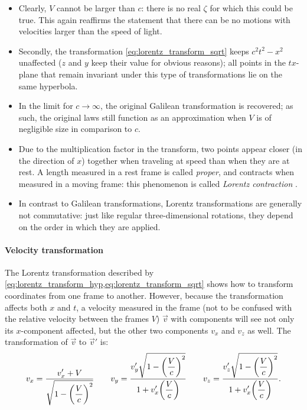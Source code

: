 \begin{itemize}
    \item Clearly, \(V\) cannot be larger than \(c\): there is no real \(\zeta\) for which this could be true. This again reaffirms the statement that there can be no motions with velocities larger than the speed of light.
    \item Secondly, the transformation \cref{eq:lorentz_transform_sqrt} keeps \(c^2t^2 - x^2\) unaffected (\(z\) and \(y\) keep their value for obvious reasons); all points in the \(tx\)-plane that remain invariant under this type of transformations lie on the same hyperbola. %
    \item In the limit for \(c \to \infty\), the original Galilean transformation is recovered; as such, the original laws still function as an approximation when \(V\) is of negligible size in comparison to \(c\).
    \item Due to the multiplication factor in the transform, two points appear closer (in the direction of $x$) together when traveling at speed than when they are at rest. A length measured in a rest frame is called \emph{proper}, and contracts when measured in a moving frame: this phenomenon is called \emph{Lorentz contraction}   \cite{Landau1971}.
    \item In contrast to Galilean transformations, Lorentz transformations are generally not commutative: just like regular three-dimensional rotations, they depend on the order in which they are applied.
\end{itemize}
\paragraph{Velocity transformation} The Lorentz transformation described by \cref{eq:lorentz_transform_hyp,eq:lorentz_transform_sqrt} shows how to transform coordinates from one frame to another. However, because the transformation affects both \(x\) and \(t\), a velocity measured in the frame (not to be confused with the relative velocity between the frames \(V\)) \(\vec{v}\) with components will see not only its \(x\)-component affected, but the other two components \(v_x\) and \(v_z\) as well. The transformation of \(\vec{v}\) to \(\vec{v}'\) is: \cite{Landau1971}
\begin{equation}
    v_x = \frac{\displaystyle v_x' + V}{\displaystyle \sqrt{1 - \qty(\frac{V}{c})^2}}\qquad 
    v_y = \frac{\displaystyle v_y'\sqrt{1 - \qty(\frac{V}{c})^2}}{\displaystyle 1 + v_x'
    \qty(\frac{V}{c})}\qquad
    v_z = \frac{\displaystyle v_z'\sqrt{1 - \qty(\frac{V}{c})^2}}{\displaystyle 1 + v_x'\qty(\frac{V}{c})}.
    \label{eq:lorentz_transform_vel}
\end{equation}

